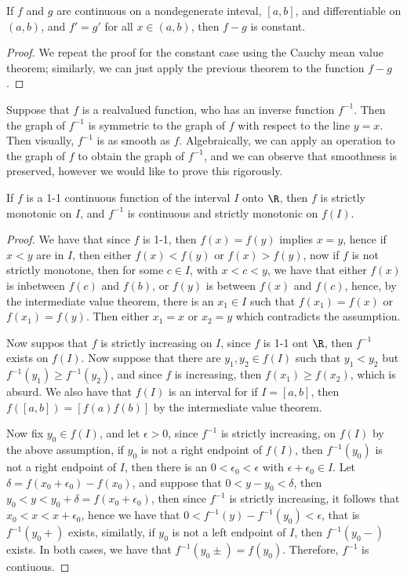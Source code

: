 \begin{remark}
    If $f$ and  $g$ are continuous on a nondegenerate inteval,  $[a,b]$, and differentiable 
    on  $(a,b)$, and  $f'=g'$ for all  $x \in (a,b)$, then $f-g$ is constant.
\end{remark}
\begin{proof}
    We repeat the proof for the constant case using the Cauchy mean value theorem; 
    similarly, we can just apply the previous theorem to the function $f-g$.
\end{proof}

Suppose that $f$ is a realvalued function, who has an inverse function  $f^{-1}$. Then 
the graph of  $f^{-1}$ is symmetric to the graph of  $f$ with respect to the line  $y=x$. Then 
visually,  $f^{-1}$ is as smooth as  $f$. Algebraically, we can apply an operation to the graph 
of $f$ to obtain the graph of  $f^{-1}$, and we can observe that smoothness is preserved, however 
we would like to prove this rigorously.

\begin{theorem}\label{4.4.2}
    If $f$ is a  1-1 continuous function of the interval  $I$ onto $\R$, 
    then  $f$ is strictly monotonic on  $I$, and  $f^{-1}$ is continuous and strictly 
    monotonic on $f(I)$.
\end{theorem}
\begin{proof}
    We have that since $f$ is 1-1, then  $f(x)=f(y)$ implies  $x=y$, hence if  $x<y$ 
    are in $I$, then  either $f(x)<f(y)$ or  $f(x)>f(y)$, now if  $f$ is not strictly monotone, then 
    for some $c \in I$, with  $x<c<y$, we have that either  $f(x)$ is inbetween $f(c)$ and  $f(b)$, 
    or  $f(y)$ is between  $f(x)$ and  $f(c)$, hence, by the intermediate value theorem, there is an  $x_1 \in I$ 
    such that $f(x_1)=f(x)$ or $f(x_1)=f(y)$. Then either $x_1=x$ or $x_2=y$ which contradicts the assumption.

    Now suppos that $f$ is strictly increasing on  $I$, since  $f$ is 1-1 ont  $\R$, then 
    $f^{-1}$ exists on  $f(I)$. Now suppose that there are  $y_1,y_2 \in f(I)$ such that 
    $ y_1<y_2$ but $f^{-1}(y_1) \geq f^{-1}(y_2)$, and since $f$ is increasing, then  $f(x_1) \geq f(x_2)$, which 
    is absurd. We also have that $f(I)$ is an interval for if  $I=[a,b]$, then  $f([a,b])=[f(a)f(b)]$ by 
    the intermediate value theorem.

    Now fix  $y_0 \in f(I)$, and let $\epsilon>0$, since $f^{-1}$ is strictly increasing, on $f(I)$ by 
    the above assumption, if $y_0$ is not a right endpoint of $f(I)$, then  $f^{-1}(y_0)$ is not 
    a  right endpoint of  $I$, then  there is an $0<\epsilon_0<\epsilon$ with $\epsilon+\epsilon_0 \in I$. Let  $\delta=f(x_0+\epsilon_0)-f(x_0)$, 
    and suppose that $0<y-y_0<\delta$, then $y_0<y<y_0+\delta=f(x_0+\epsilon_0)$, then since $f^{-1}$ is strictly 
    increasing, it follows that  $x_0<x<x+\epsilon_0$, hence we have that $0<f^{-1}(y)-f^{-1}(y_0)<\epsilon$, 
    that is $f^{-1}(y_0+)$ exists, similatly, if $y_0$ is not a left endpoint of $I$, then  $f^{-1}(y_0-)$ 
    exists. In both cases, we have that $f^{-1}(y_0\pm)=f(y_0)$. Therefore, $f^{-1}$ is contiuous.
\end{proof}

